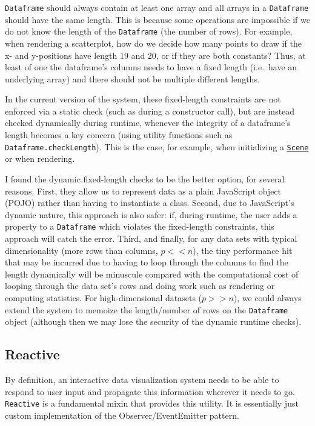 \documentclass[
]{book}
\theoremstyle{definition}
\theoremstyle{definition}
\theoremstyle{definition}
\theoremstyle{definition}
\theoremstyle{remark}
\begin{document}
\texttt{Dataframe} should always contain at least one array and all arrays in a \texttt{Dataframe} should have the same length. This is because some operations are impossible if we do not know the length of the \texttt{Dataframe} (the number of rows). For example, when rendering a scatterplot, how do we decide how many points to draw if the x- and y-positions have length 19 and 20, or if they are both constants? Thus, at least of one the dataframe's columns needs to have a fixed length (i.e.~have an underlying array) and there should not be multiple different lengths.

In the current version of the system, these fixed-length constraints are not enforced via a static check (such as during a constructor call), but are instead checked dynamically during runtime, whenever the integrity of a dataframe's length becomes a key concern (using utility functions such as \texttt{Dataframe.checkLength}). This is the case, for example, when initializing a \hyperref[Scene]{\texttt{Scene}} or when rendering.

I found the dynamic fixed-length checks to be the better option, for several reasons. First, they allow us to represent data as a plain JavaScript object (POJO) rather than having to instantiate a class. Second, due to JavaScript's dynamic nature, this approach is also safer: if, during runtime, the user adds a property to a \texttt{Dataframe} which violates the fixed-length constraints, this approach will catch the error. Third, and finally, for any data sets with typical dimensionality (more rows than columns, \(p << n\)), the tiny performance hit that may be incurred due to having to loop through the columns to find the length dynamically will be minuscule compared with the computational cost of looping through the data set's rows and doing work such as rendering or computing statistics. For high-dimensional datasets (\(p >> n\)), we could always extend the system to memoize the length/number of rows on the \texttt{Dataframe} object (although then we may lose the security of the dynamic runtime checks).

\subsection{Reactive}\label{reactive}

By definition, an interactive data visualization system needs to be able to respond to user input and propagate this information wherever it needs to go. \texttt{Reactive} is a fundamental mixin that provides this utility. It is essentially just custom implementation of the Observer/EventEmitter pattern.
\end{document}
